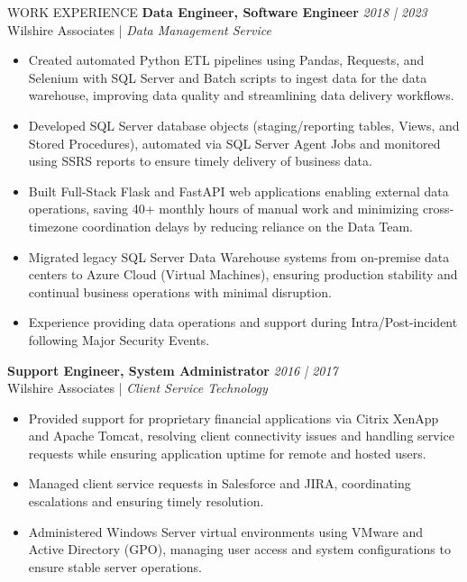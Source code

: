 \documentclass{resume} %
\begin{document}
\begin{rSection}{WORK EXPERIENCE}
\vspace{-6pt}
\textbf{Data Engineer, Software Engineer} \hfill \textit{2018 | 2023} \\
Wilshire Associates | \textit{Data Management Service}
\vspace{-6pt}
\begin{itemize}
    \itemsep -6pt {}
    \item Created automated Python ETL pipelines using Pandas, Requests, and Selenium with SQL Server and Batch scripts to ingest data for the data warehouse, improving data quality and streamlining data delivery workflows.
    \item Developed SQL Server database objects (staging/reporting tables, Views, and Stored Procedures), automated via SQL Server Agent Jobs and monitored using SSRS reports to ensure timely delivery of business data.
    \item Built Full-Stack Flask and FastAPI web applications enabling external data operations, saving 40+ monthly hours of manual work and minimizing cross-timezone coordination delays by reducing reliance on the Data Team.
    \item Migrated legacy SQL Server Data Warehouse systems from on-premise data centers to Azure Cloud (Virtual Machines), ensuring production stability and continual business operations with minimal disruption.
    \item Experience providing data operations and support during Intra/Post-incident following Major Security Events.
\end{itemize}
\vspace{-6pt}
\textbf{Support Engineer, System Administrator} \hfill \textit{2016 | 2017} \\
Wilshire Associates | \textit{Client Service Technology}
\vspace{-6pt}
\begin{itemize}
    \itemsep -6pt {}
    \item Provided support for proprietary financial applications via Citrix XenApp and Apache Tomcat, resolving client connectivity issues and handling service requests while ensuring application uptime for remote and hosted users.
    \item Managed client service requests in Salesforce and JIRA, coordinating escalations and ensuring timely resolution.
    \item Administered Windows Server virtual environments using VMware and Active Directory (GPO), managing user access and system configurations to ensure stable server operations.
\end{itemize}
\vspace{-6pt}
\end{rSection}
\end{document}
